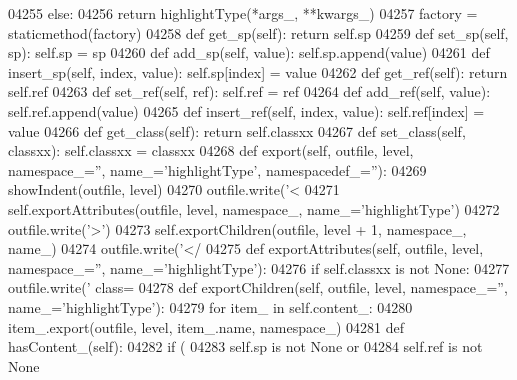\begin{DoxyCode}
{{{{{{{{{{{{{{{{{{{{{{{{{{{{{{{{{{{{{{{{{{{{{{{{{{{{{{{{{{{{{{{{{{{{{{{{{{{{{{{{{{{{{{{{{{{{{{{{{{{{{{{{{{{{{{{{{{{{{{{{{{{{{{{{{{{{{{{{{{{{{{{{{{{{{{{{{{{{{{{{{{{{{{{{{{{{{{{{{{{{{{{{{{{{{{{{{{{{{{{{{{{{{{{{{{{{{{{{{{{{{{{{{{{{{{{{{{{{{{{{{{{{{{{{{{{{{{{{{{{{{{{{{{{{{{{{{{{{{{04255         \textcolor{keywordflow}{else}:
04256             \textcolor{keywordflow}{return} highlightType(*args\_, **kwargs\_)
04257     factory = staticmethod(factory)
04258     \textcolor{keyword}{def }get_sp(self): \textcolor{keywordflow}{return} self.sp
04259     \textcolor{keyword}{def }set_sp(self, sp): self.sp = sp
04260     \textcolor{keyword}{def }add_sp(self, value): self.sp.append(value)
04261     \textcolor{keyword}{def }insert_sp(self, index, value): self.sp[index] = value
04262     \textcolor{keyword}{def }get_ref(self): \textcolor{keywordflow}{return} self.ref
04263     \textcolor{keyword}{def }set_ref(self, ref): self.ref = ref
04264     \textcolor{keyword}{def }add_ref(self, value): self.ref.append(value)
04265     \textcolor{keyword}{def }insert_ref(self, index, value): self.ref[index] = value
04266     \textcolor{keyword}{def }get_class(self): \textcolor{keywordflow}{return} self.classxx
04267     \textcolor{keyword}{def }set_class(self, classxx): self.classxx = classxx
04268     \textcolor{keyword}{def }export(self, outfile, level, namespace\_='', name\_='highlightType', namespacedef\_=''):
04269         showIndent(outfile, level)
04270         outfile.write(\textcolor{stringliteral}{'<%
04271         self.exportAttributes(outfile, level, namespace\_, name\_=\textcolor{stringliteral}{'highlightType'})
04272         outfile.write(\textcolor{stringliteral}{'>'})
04273         self.exportChildren(outfile, level + 1, namespace\_, name\_)
04274         outfile.write(\textcolor{stringliteral}{'</%
04275     \textcolor{keyword}{def }exportAttributes(self, outfile, level, namespace\_='', name\_='highlightType'):
04276         \textcolor{keywordflow}{if} self.classxx \textcolor{keywordflow}{is} \textcolor{keywordflow}{not} \textcolor{keywordtype}{None}:
04277             outfile.write(\textcolor{stringliteral}{' class=%
04278     \textcolor{keyword}{def }exportChildren(self, outfile, level, namespace\_='', name\_='highlightType'):
04279         \textcolor{keywordflow}{for} item\_ \textcolor{keywordflow}{in} self.content_:
04280             item\_.export(outfile, level, item\_.name, namespace\_)
04281     \textcolor{keyword}{def }hasContent_(self):
04282         \textcolor{keywordflow}{if} (
04283             self.sp \textcolor{keywordflow}{is} \textcolor{keywordflow}{not} \textcolor{keywordtype}{None} \textcolor{keywordflow}{or}
04284             self.ref \textcolor{keywordflow}{is} \textcolor{keywordflow}{not} \textcolor{keywordtype}{None}
}}}}}}}}}}}}}}}}}}}}}}}}}}}}}}}}}}}}}}}}}}}}}}}}}}}}}}}}}}}}}}}}}}}}}}}}}}}}}}}}}}}}}}}}}}}}}}}}}}}}}}}}}}}}}}}}}}}}}}}}}}}}}}}}}}}}}}}}}}}}}}}}}}}}}}}}}}}}}}}}}}}}}}}}}}}}}}}}}}}}}}}}}}}}}}}}}}}}}}}}}}}}}}}}}}}}}}}}}}}}}}}}}}}}}}}}}}}}}}}}}}}}}}}}}}}}}}}}}}}}}}}}}}}}}}}}}}}}}}}}}
\end{DoxyCode}
